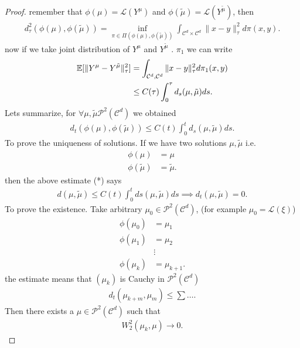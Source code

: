 \begin{proof}
 remember that $\phi(\mu) = \mathcal{L}(Y^{\mu } )$ and $\phi(\tilde{\mu } ) = \mathcal{L}(Y^{\tilde{\mu } } )$, then
 \begin{align*}
   d_{\tau }^2(\phi(\mu ),\phi(\tilde{\mu } )) =  \inf_{\pi  \in  \Pi(\phi(\mu) ,\phi(\tilde{\mu } ))} \int_{\mathcal{C}^{d} \times  \mathcal{C}^{d}   } \|x-y\|_\tau^2 d\pi(x,y)
 .\end{align*}
 now if we take joint distribution of $Y^{\mu } $ and $Y^{\tilde{\mu } }$ . $\pi_1$ we can write 
 \begin{align*}
   \mathbb{E}[\|Y^{\mu }-Y^{\tilde{\mu } } \|_\tau^2 ] &= \int_{\mathcal{C}^{d},\mathcal{C}^{d}  } \|x-y\|_{\tau }^{2} d\pi_1(x,y)  \\
                                               &\le  C(\tau ) \int_0^{\tau } d_s(\mu ,\tilde{\mu } )ds
 .\end{align*}
 Lets summarize, for $\forall  \mu , \tilde{\mu } \mathcal{P}^2(\mathcal{C}^{d} ) $ we obtained 
 \begin{align*}
   d_t(\phi(\mu ),\phi(\tilde{\mu } )) \le C(t) \int_0^{t} d_s(\mu ,\tilde{\mu } ) ds \tag{*}
 .\end{align*}
To prove the uniqueness of solutions. If we have two solutions $\mu ,\tilde{\mu } $ i.e. 
\begin{align*}
  \phi(\mu ) &= \mu \\
  \phi(\tilde{\mu } ) &= \tilde{\mu } 
.\end{align*}
then the above estimate (*) says 
\begin{align*}
  d(\mu,\tilde{\mu } ) \le  C(t) \int_0^{t} ds(\mu ,\tilde{\mu } )  ds \implies d_t(\mu ,\tilde{\mu } )  = 0
.\end{align*}
To prove the existence. Take arbitrary $\mu_0 \in  \mathcal{P}^2(\mathcal{C}^{d} )$, (for example $\mu_0 = \mathcal{L}(\xi)$)
\begin{align*}
  \phi(\mu_0) &= \mu_1 \\
  \phi(\mu_1) &= \mu_2 \\
              &\vdots \\
  \phi(\mu_k) &= \mu_{k+1}
.\end{align*}
the estimate means that $(\mu_k)$ is Cauchy in $\mathcal{P}^2(\mathcal{C}^{d} )$
\begin{align*}
  d_t(\mu_{k+m},\mu_m) \le  \sum \ldots 
.\end{align*}
Then there exists a $\mu \in \mathcal{P}^2(\mathcal{C}^{d} )$ such that 
\begin{align*}
  W_2^{2}(\mu_k,\mu ) \to  0 
.\end{align*}
\end{proof}
